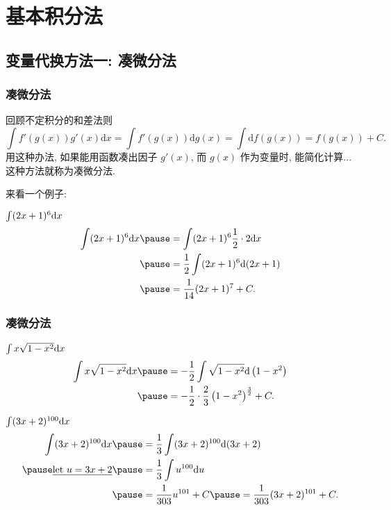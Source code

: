 \documentclass[
10pt,
aspectratio=43,
]{beamer}
\begin{document}
\section{基本积分法}

\subsection{变量代换方法一: 凑微分法}


\begin{frame}
	\frametitle{凑微分法}
	\everymath{\displaystyle}
	回顾不定积分的和差法则
	$$
		\int f'(g(x))g'(x)\mathrm{d}x=\int f'(g(x))\mathrm{d}g(x)=\int \mathrm{d}f(g(x))= f(g(x))+C.
	$$
	\pause
	用这种办法, 如果能用函数凑出因子 $g'(x)$, 而 $g(x)$ 作为变量时, 能简化计算...这种方法就称为凑微分法.
	\vspace{0.3cm}

	来看一个例子:
	\pause
	\vspace{0.1cm}
	\begin{exampleblock}{$\color{black}\int(2 x+1)^6 \mathrm{d} x$}
		$$
			\begin{aligned}
				\int(2 x+1)^6 \mathrm{d} x & \pause=  \int(2 x+1)^6 \frac{1}{2}\cdot 2 \mathrm{d} x \\
				                           & \pause=  \frac{1}{2}\int(2 x+1)^6 \mathrm{d} (2x+1)    \\
				                           & \pause= \frac{1}{14}(2x+1)^7+C.
			\end{aligned}
		$$
	\end{exampleblock}

\end{frame}

\begin{frame}
	\frametitle{凑微分法}
	\everymath{\displaystyle}
	\begin{exampleblock}{$\color{black}\int x \sqrt{1-x^2} \mathrm{d} x$}
		$$
			\begin{aligned}
				\int x \sqrt{1-x^2} \mathrm{d} x & \pause= -\frac{1}{2} \int \sqrt{1-x^2} \mathrm{d}\left(1-x^2\right)       \\
				                                 & \pause= -\frac{1}{2} \cdot \frac{2}{3}\left(1-x^2\right)^{\frac{3}{2}}+C.
			\end{aligned}
		$$
	\end{exampleblock}
	\pause
	\begin{exampleblock}{$\color{black}\int (3x+2)^{100} \mathrm{d}x$}
		$$
			\begin{aligned}
				\int (3x+2)^{100} \mathrm{d}x       & \pause= \frac{1}{3} \int (3x+2)^{100} \mathrm{d}(3x+2)                \\
				\pause\underline{\text{let }u=3x+2} & \pause=  \frac{1}{3} \int u^{100} \mathrm{d}u                         \\
				                                    & \pause= \frac{1}{303} u^{101}+C \pause = \frac{1}{303}(3x+2)^{101}+C.
			\end{aligned}
		$$
	\end{exampleblock}
\end{frame}
\end{document}
